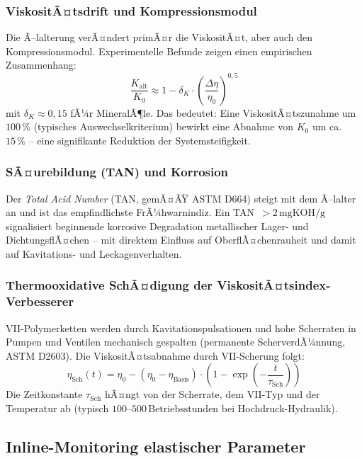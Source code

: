 ﻿\documentclass[a4paper,12pt]{scrreprt}
\theoremstyle{definition}
\begin{document}
\subsubsection{ViskositÃ¤tsdrift und Kompressionsmodul}

Die Ã–lalterung verÃ¤ndert primÃ¤r die ViskositÃ¤t, aber auch den
Kompressionsmodul. Experimentelle Befunde zeigen einen empirischen
Zusammenhang:
\begin{equation}
  \frac{K_{\mathrm{alt}}}{K_0} \approx 1 - \delta_K \cdot
    \left(\frac{\Delta\eta}{\eta_0}\right)^{0{,}5}
  \label{eq:k_alterung}
\end{equation}
mit $\delta_K \approx 0{,}15$ fÃ¼r MineralÃ¶le. Das bedeutet: Eine
ViskositÃ¤tszunahme um $100\,\%$ (typisches Auswechselkriterium) bewirkt
eine Abnahme von $K_0$ um ca.\ $15\,\%$ -- eine signifikante Reduktion
der Systemsteifigkeit.

\subsubsection{SÃ¤urebildung (TAN) und Korrosion}

Der \emph{Total Acid Number} (TAN, gemÃ¤ÃŸ ASTM D664) steigt mit dem
Ã–lalter an und ist das empfindlichste FrÃ¼hwarnindiz. Ein TAN~$> 2\,\mathrm{mgKOH/g}$
signalisiert beginnende korrosive Degradation metallischer Lager- und
DichtungsflÃ¤chen -- mit direktem Einfluss auf OberflÃ¤chenrauheit und
damit auf Kavitations- und Leckagenverhalten.

\subsubsection{Thermooxidative SchÃ¤digung der ViskositÃ¤tsindex-Verbesserer}

VII-Polymerketten werden durch Kavitationspulsationen und hohe Scherraten
in Pumpen und Ventilen mechanisch gespalten (permanente ScherverdÃ¼nnung,
ASTM D2603). Die ViskositÃ¤tsabnahme durch VII-Scherung folgt:
\begin{equation}
  \eta_{\mathrm{Sch}}(t) = \eta_0 - (\eta_0 - \eta_{\mathrm{Basis}}) \cdot
    \left(1 - \exp\!\left(-\frac{t}{\tau_{\mathrm{Sch}}}\right)\right)
  \label{eq:vii_scherung}
\end{equation}
Die Zeitkonstante $\tau_{\mathrm{Sch}}$ hÃ¤ngt von der Scherrate, dem
VII-Typ und der Temperatur ab (typisch $100$--$500\,\mathrm{Betriebsstunden}$
bei Hochdruck-Hydraulik).

\subsection{Inline-Monitoring elastischer Parameter}
\end{document}
